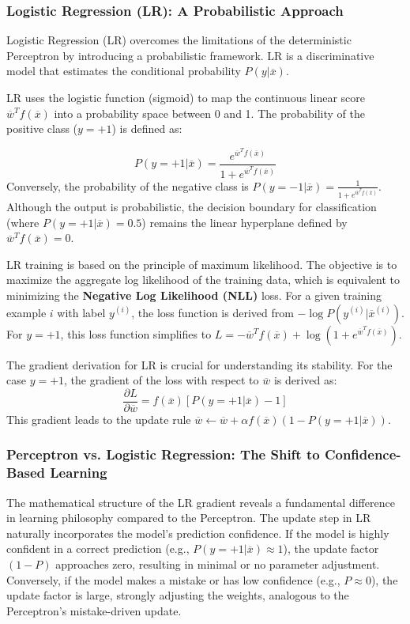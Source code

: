 \documentclass{article}
\begin{document}
\subsubsection{Logistic Regression (LR): A Probabilistic Approach}

Logistic Regression (LR) overcomes the limitations of the deterministic Perceptron by introducing a probabilistic framework. LR is a discriminative model that estimates the conditional probability $P(y|\overline{x})$.

LR uses the logistic function (sigmoid) to map the continuous linear score $\overline{w}^{T}f(\overline{x})$ into a probability space between 0 and 1. The probability of the positive class ($y=+1$) is defined as:

$$P(y=+1|\overline{x})=\frac{e^{\overline{w}^{T}f(\overline{x})}}{1+e^{\overline{w}^{T}f(\overline{x})}}$$
Conversely, the probability of the negative class is $P(y=-1|\overline{x})=\frac{1}{1+e^{\overline{w}^{T}f(\overline{x})}}$. Although the output is probabilistic, the decision boundary for classification (where $P(y=+1|\overline{x}) = 0.5$) remains the linear hyperplane defined by $\overline{w}^{T}f(\overline{x}) = 0$.

LR training is based on the principle of maximum likelihood. The objective is to maximize the aggregate log likelihood of the training data, which is equivalent to minimizing the \textbf{Negative Log Likelihood (NLL)} loss. For a given training example $i$ with label $y^{(i)}$, the loss function is derived from $-\log P(y^{(i)}|\overline{x}^{(i)})$. For $y=+1$, this loss function simplifies to $L = -\overline{w}^{T}f(\overline{x}) + \log(1+e^{\overline{w}^{T}f(\overline{x})})$.

The gradient derivation for LR is crucial for understanding its stability. For the case $y=+1$, the gradient of the loss with respect to $\overline{w}$ is derived as:
$$\frac{\partial L}{\partial\overline{w}} = f(\overline{x})[P(y=+1|\overline{x})-1]$$
This gradient leads to the update rule $\overline{w} \leftarrow \overline{w} + \alpha f(\overline{x})(1-P(y=+1|\overline{x}))$.

\subsubsection{Perceptron vs. Logistic Regression: The Shift to Confidence-Based Learning}

The mathematical structure of the LR gradient reveals a fundamental difference in learning philosophy compared to the Perceptron. The update step in LR naturally incorporates the model's prediction confidence. If the model is highly confident in a correct prediction (e.g., $P(y=+1|\overline{x}) \approx 1$), the update factor $(1-P)$ approaches zero, resulting in minimal or no parameter adjustment. Conversely, if the model makes a mistake or has low confidence (e.g., $P \approx 0$), the update factor is large, strongly adjusting the weights, analogous to the Perceptron's mistake-driven update.
\end{document}
